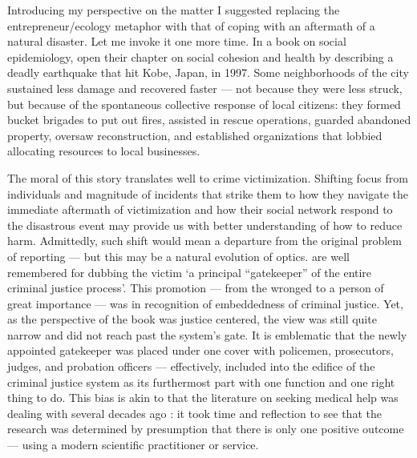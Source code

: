 \documentclass[]{interact}
\theoremstyle{plain}%
\theoremstyle{definition}
\theoremstyle{remark}
\newcommand\citep{\parencite}
\newcommand\citet{\textcite}
\begin{document}
	Introducing my perspective on the matter I suggested replacing the entrepreneur/ecology metaphor with that of coping with an aftermath of a natural disaster. 
	Let me invoke it one more time. In a book on social epidemiology, \citet{kawachi2014social} open their chapter on social cohesion and health by describing a deadly earthquake that hit Kobe, Japan, in 1997. Some neighborhoods of the city sustained less damage and recovered faster --- not because they were less struck, but because of the spontaneous collective response of local citizens: they formed bucket brigades to put out fires, assisted in rescue operations, guarded abandoned property, oversaw reconstruction, and established organizations that lobbied allocating resources to local businesses. 
	
	The moral of this story translates well to crime victimization. Shifting focus from individuals and magnitude of incidents that strike them to how they navigate the immediate aftermath of victimization and how their social network respond to the disastrous event may provide us with better understanding of how to reduce harm. Admittedly, such shift would mean a departure from the original problem of reporting --- but this may be a natural evolution of optics. \citet{gottfredson1987decision} are well remembered for dubbing the victim `a principal ``gatekeeper'' of the entire criminal justice process'. This promotion --- from the wronged to a person of great importance --- was in recognition of embeddedness of criminal justice. Yet, as the perspective of the book was justice centered, the view was still quite narrow and did not reach past the system's gate. It is emblematic that the newly appointed gatekeeper was placed under one cover with policemen, prosecutors, judges, and probation officers --- effectively, included into the edifice of the criminal justice system as its furthermost part with one function and one right thing to do. This bias is akin to that the literature on seeking medical help was dealing with several decades ago \citep{pescosolido1992beyond}: it took time and reflection to see that the research was determined by presumption that there is only one positive outcome --- using a modern scientific practitioner or service. 
	
\end{document}
